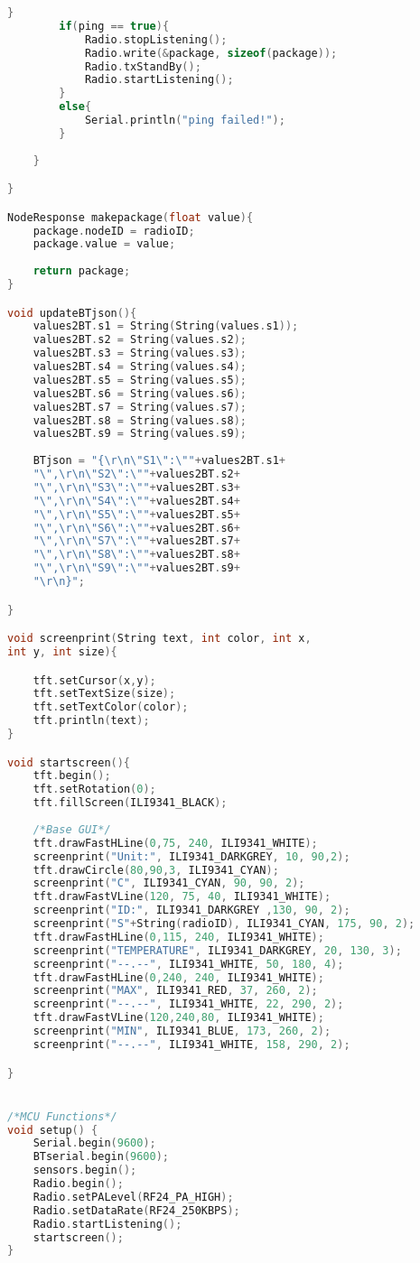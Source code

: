 \begin{lstlisting}[language=C++, caption={Firmware de nuestro prototipo en su versión 1.0}, captionpos=b, basicstyle=\small]
		}
		if(ping == true){
			Radio.stopListening();
			Radio.write(&package, sizeof(package));
			Radio.txStandBy();
			Radio.startListening();
		}
		else{
			Serial.println("ping failed!");
		}
	
	}

}

NodeResponse makepackage(float value){
	package.nodeID = radioID;
	package.value = value;
	
	return package;
}

void updateBTjson(){
	values2BT.s1 = String(String(values.s1));
	values2BT.s2 = String(values.s2);
	values2BT.s3 = String(values.s3);
	values2BT.s4 = String(values.s4);
	values2BT.s5 = String(values.s5);
	values2BT.s6 = String(values.s6);
	values2BT.s7 = String(values.s7);
	values2BT.s8 = String(values.s8);
	values2BT.s9 = String(values.s9);
	
	BTjson = "{\r\n\"S1\":\""+values2BT.s1+
	"\",\r\n\"S2\":\""+values2BT.s2+
	"\",\r\n\"S3\":\""+values2BT.s3+
	"\",\r\n\"S4\":\""+values2BT.s4+
	"\",\r\n\"S5\":\""+values2BT.s5+
	"\",\r\n\"S6\":\""+values2BT.s6+
	"\",\r\n\"S7\":\""+values2BT.s7+
	"\",\r\n\"S8\":\""+values2BT.s8+
	"\",\r\n\"S9\":\""+values2BT.s9+
	"\r\n}";

}

void screenprint(String text, int color, int x, 
int y, int size){

	tft.setCursor(x,y);
	tft.setTextSize(size);
	tft.setTextColor(color);
	tft.println(text);
}

void startscreen(){
	tft.begin();
	tft.setRotation(0);
	tft.fillScreen(ILI9341_BLACK);
	
	/*Base GUI*/
	tft.drawFastHLine(0,75, 240, ILI9341_WHITE);
	screenprint("Unit:", ILI9341_DARKGREY, 10, 90,2);
	tft.drawCircle(80,90,3, ILI9341_CYAN);
	screenprint("C", ILI9341_CYAN, 90, 90, 2);
	tft.drawFastVLine(120, 75, 40, ILI9341_WHITE);
	screenprint("ID:", ILI9341_DARKGREY ,130, 90, 2);
	screenprint("S"+String(radioID), ILI9341_CYAN, 175, 90, 2);
	tft.drawFastHLine(0,115, 240, ILI9341_WHITE);
	screenprint("TEMPERATURE", ILI9341_DARKGREY, 20, 130, 3);
	screenprint("--.--", ILI9341_WHITE, 50, 180, 4);
	tft.drawFastHLine(0,240, 240, ILI9341_WHITE);
	screenprint("MAX", ILI9341_RED, 37, 260, 2);
	screenprint("--.--", ILI9341_WHITE, 22, 290, 2);
	tft.drawFastVLine(120,240,80, ILI9341_WHITE);
	screenprint("MIN", ILI9341_BLUE, 173, 260, 2);
	screenprint("--.--", ILI9341_WHITE, 158, 290, 2);

}


/*MCU Functions*/
void setup() {
	Serial.begin(9600);
	BTserial.begin(9600);
	sensors.begin();
	Radio.begin();
	Radio.setPALevel(RF24_PA_HIGH);
	Radio.setDataRate(RF24_250KBPS);
	Radio.startListening();
	startscreen();
}


\end{lstlisting}
